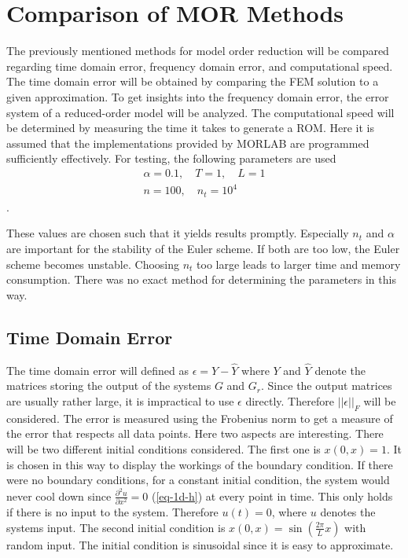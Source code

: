 \chapter{Comparison of MOR Methods} \label{analysis}
The previously mentioned methods for model order reduction will be compared regarding time domain error, frequency domain error, and computational speed.
The time domain error will be obtained by comparing the FEM solution to a given approximation.
To get insights into the frequency domain error, the error system of a reduced-order model will be analyzed.
The computational speed will be determined by measuring the time it takes to generate a ROM.
Here it is assumed that the implementations provided by MORLAB are programmed sufficiently effectively.
For testing, the following parameters are used
\begin{gather}
\alpha = 0.1, \quad T = 1, \quad L = 1 \\
n = 100, \quad n_t = 10^{4}
\end{gather}
.

These values are chosen such that it yields results promptly.
Especially \(n_t\) and \(\alpha\) are important for the stability of the Euler scheme.
If both are too low, the Euler scheme becomes unstable.
Choosing \(n_t\) too large leads to larger time and memory consumption.
There was no exact method for determining the parameters in this way.

\section{Time Domain Error}
The time domain error will defined as \(\epsilon = Y - \hat{Y}\) where \(Y\) and \(\hat{Y}\) denote the matrices storing the output of the systems \(G\) and \(G_r\).
Since the output matrices are usually rather large, it is impractical to use \(\epsilon\) directly.
Therefore  \(||\epsilon||_{F}\) will be considered.
The error is measured using the Frobenius norm to get a measure of the error that respects all data points.
Here two aspects are interesting.
There will be two different initial conditions considered.
The first one is \(x(0, x) = 1\).
It is chosen in this way to display the workings of the boundary condition.
If there were no boundary conditions, for a constant initial condition, the system would never cool down since \(\frac{\partial^2 u}{\partial x^2} = 0\) (\ref{eq-1d-h}) at every point in time.
This only holds if there is no input to the system.
Therefore \(u(t) = 0\), where \(u\) denotes the systems input.
The second initial condition is \(x(0, x) = \sin(\frac{2\pi}{L}x)\) with random input.
The initial condition is sinusoidal since it is easy to approximate.

